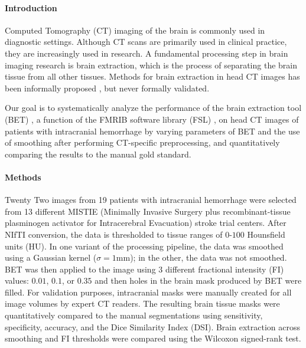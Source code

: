 \documentclass[10pt]{article}\usepackage[]{graphicx}\usepackage[]{color}
\begin{document}
\renewcommand{\thesubfigure}{\Alph{subfigure}}

\vspace{-1cm}
\paragraph*{Introduction}
Computed Tomography (CT) imaging of the brain is commonly used in diagnostic settings.  Although CT scans are primarily used in clinical practice, they are increasingly used in research.  A fundamental processing step in brain imaging research is brain extraction, which is the process of separating the brain tissue from all other tissues. Methods for brain extraction in head CT images has been informally proposed \citep{able, rorden_age-specific_2012}, but never formally validated.

Our goal is to systematically analyze the performance of the brain extraction tool (BET) \citep{smith_fast_2002}, a function of the FMRIB software library (FSL) \citep{jenkinson_fsl_2012}, on head CT images of patients with intracranial hemorrhage by varying parameters of BET and the use of smoothing after performing CT-specific preprocessing, and quantitatively comparing the results to the manual gold standard.

\vspace{-0.4cm}
\paragraph*{Methods}
Twenty Two images from 19 patients with intracranial hemorrhage were selected from 13 different MISTIE (Minimally Invasive Surgery plus recombinant-tissue plasminogen activator for Intracerebral Evacuation) stroke trial centers. After NIfTI conversion, the data is thresholded to tissue ranges of $0$-$100$ Hounsfield units (HU).  In one variant of the processing pipeline, the data was smoothed using a Gaussian kernel ($\sigma=1$mm); in the other, the data was not smoothed.  BET was then applied to the image using 3 different fractional intensity (FI) values: $0.01$, $0.1$, or $0.35$ and then holes in the brain mask produced by BET were filled.
For validation purposes, intracranial masks were manually created for all image volumes by expert CT readers.  The resulting brain tissue masks were quantitatively compared to the manual segmentations using sensitivity, specificity, accuracy, and the Dice Similarity Index (DSI).  Brain extraction across smoothing and FI thresholds were compared using the Wilcoxon signed-rank test.
\end{document}
